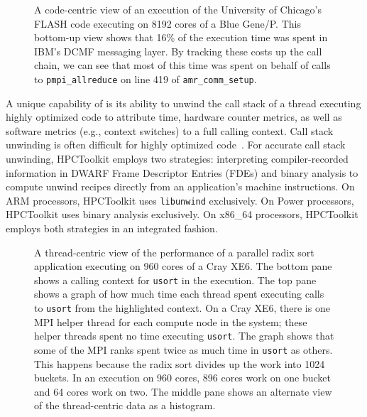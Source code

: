 \documentclass[11pt,twoside,letterpaper]{report}
\begin{document}
\begin{figure}[t]
\caption{A code-centric view of an execution of the University of Chicago's FLASH code executing on 8192 cores of a Blue Gene/P. This bottom-up view shows that 16\% of the execution time was spent in IBM's DCMF messaging layer. By tracking these costs up the call chain, we can see that most of this time   was spent on behalf of calls to {\tt pmpi\_allreduce} on line 419 of {\tt amr\_comm\_setup}.}
\label{fig:code-centric}
\end{figure}

A unique capability of \HPCToolkit{} is its ability to unwind the call stack of a thread executing highly optimized code to attribute time, hardware counter metrics, as well as software metrics (e.g., context switches) to a full calling context.
Call stack unwinding is often difficult for highly optimized code~\cite{Tallent-MC-Fagan:2009:PLDI-hpctoolkit-binary-analysis}. For accurate call stack unwinding, HPCToolkit employs two strategies:
interpreting compiler-recorded information in DWARF Frame Descriptor Entries (FDEs) and binary analysis
to compute unwind recipes directly from an application's  machine instructions.
On ARM processors, HPCToolkit uses {\tt libunwind} exclusively. On Power processors, HPCToolkit uses
binary analysis exclusively.
On x86\_64 processors, HPCToolkit employs both strategies in an integrated fashion.

\begin{figure}[t]
\caption{A thread-centric view of the performance of a parallel radix sort application executing on 960 cores of a Cray XE6. The bottom pane shows a calling context for {\tt usort} in the execution. The top pane shows a graph of how much time each thread spent executing calls to {\tt usort} from the   highlighted context.  On a Cray XE6, there is one MPI helper thread for each compute node in the system; these helper threads spent no time executing {\tt usort}. The graph shows that some of the MPI ranks spent twice as much time in {\tt usort} as others. This happens because the radix sort divides up the work into 1024 buckets. In an execution on 960 cores,  896 cores work on one bucket and 64 cores work on two. The middle pane shows an alternate view of the thread-centric data as a histogram.}
\label{fig:thread-centric}
\end{figure}
\end{document}
